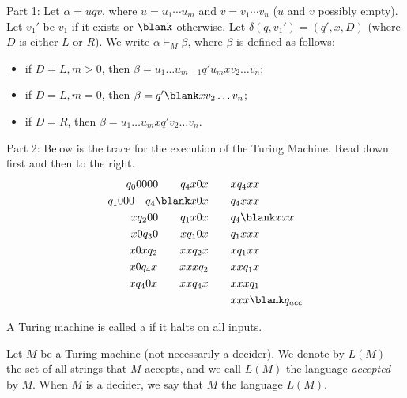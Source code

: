 \begin{solution}
\label{sol:Turing-Machines::part}
Part 1: Let $\alpha = uqv$, where $u = u_1\cdots u_m$ and $v =v_1\cdots v_n$ ($u$ and $v$ possibly empty). Let $v_1'$ be $v_1$ if it exists or $\blank$ otherwise. Let $\delta(q, v_1') =  (q', x, D)$ (where $D$ is either $L$ or $R$). We write $\alpha \vdash_M \beta$, where $\beta$ is defined as follows: 
\begin{itemize}
    \item if $D = L, m > 0$, then $\beta  = u_1 \ldots u_{m-1} q' u_m x v_2 \ldots v_n$;
    \item if $D = L, m = 0$, then $\beta  =  q' \blank x v_2 \ldots v_n$;
    \item if $D = R$, then $\beta = u_1 \ldots u_m x q' v_2 \ldots v_n$.
\end{itemize}

\noindent
Part 2: Below is the trace for the execution of the Turing Machine. Read down first and then to the right. 
\[ \begin{align*}
     q_00000  \qquad   q_4x0x        \qquad  & x q_4 xx  \\
     q_1000  \quad   q_4\blank x0x \qquad  & q_4 x x x  \\
     x q_200 \qquad   q_1 x0x       \qquad  &q_4 \blank  xxx  \\
     x 0q_30 \qquad   x q_1 0x      \qquad  & q_1 xxx  \\
     x 0xq_2 \qquad   xxq_2 x       \qquad  & x q_1 xx  \\
     x 0q_4x \qquad   xxxq_2        \qquad  &  xxq_1 x  \\
     x q_40x \qquad   xxq_4 x       \qquad  & xxx q_1 \\
    &  xxx \blank q_{acc} 
\end{align*} \]

\end{solution}

\begin{definition}
\label{definition:Decider-Turing-machine}
A Turing machine is called a  if it halts on all inputs.

\end{definition}

\begin{definition}
\label{definition:Language-accepted-and-decided-by-a-TM}
Let $M$ be a Turing machine (not necessarily a decider). We denote by $L(M)$ the set of all strings that $M$ accepts, and we call $L(M)$ the language \emph{accepted} by $M$. When $M$ is a decider, we say that $M$  the language $L(M)$.

\end{definition}

